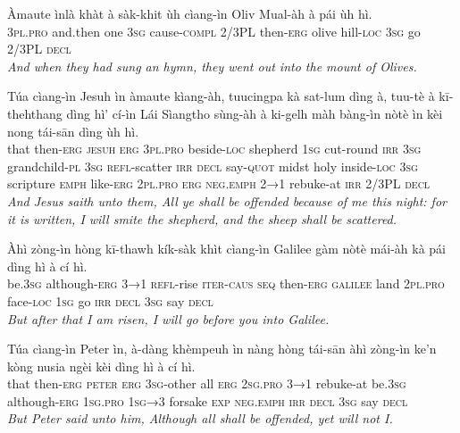 \documentclass[11pt,a4paper]{article}
\begin{document}
\begin{exe}
\gll Àmaute ìnlà khàt à sàk-khit ùh cìang-ìn Oliv Mual-àh à pái ùh hì. \\
     \textsc{3pl}.\textsc{pro} and.then one \textsc{3sg} cause-\textsc{compl} 2/3PL then-\textsc{erg} olive hill-\textsc{loc} \textsc{3sg} go 2/3PL \textsc{decl} \\
\glt \textcolor{kjvcolor}{\textit{And when they had sung an hymn, they went out into the mount of Olives.}}

\gll Túa cìang-ìn Jesuh ìn àmaute kìang-àh, tuucingpa kà sat-lum dìng à, tuu-tè à kī-thehthang dìng hì' cí-ìn Lái Sìangtho sùng-àh à ki-gelh màh bàng-ìn nòtè ìn kèi nong tái-sān dìng ùh hì. \\
     that then-\textsc{erg} \textsc{jesuh} \textsc{erg} \textsc{3pl}.\textsc{pro} beside-\textsc{loc} shepherd \textsc{1sg} cut-round \textsc{irr} \textsc{3sg} grandchild-\textsc{pl} \textsc{3sg} \textsc{refl}-scatter \textsc{irr} \textsc{decl} say-\textsc{quot} midst holy inside-\textsc{loc} \textsc{3sg} scripture \textsc{emph} like-\textsc{erg} \textsc{2pl}.\textsc{pro} \textsc{erg} \textsc{neg}.\textsc{emph} \textsc{2→1} rebuke-at \textsc{irr} 2/3PL \textsc{decl} \\
\glt \textcolor{kjvcolor}{\textit{And Jesus saith unto them, All ye shall be offended because of me this night: for it is written, I will smite the shepherd, and the sheep shall be scattered.}}

\gll Àhì zòng-ìn hòng kī-thawh kík-sàk khìt cìang-ìn Galilee gàm nòtè mái-àh kà pái dìng hì à cí hì. \\
     be.\textsc{3sg} although-\textsc{erg} \textsc{3→1} \textsc{refl}-rise \textsc{iter}-\textsc{caus} \textsc{seq} then-\textsc{erg} \textsc{galilee} land \textsc{2pl}.\textsc{pro} face-\textsc{loc} \textsc{1sg} go \textsc{irr} \textsc{decl} \textsc{3sg} say \textsc{decl} \\
\glt \textcolor{kjvcolor}{\textit{But after that I am risen, I will go before you into Galilee.}}

\gll Túa cìang-ìn Peter ìn, à-dàng khèmpeuh ìn nàng hòng tái-sān àhì zòng-ìn ke'n kòng nusia ngèi kèi dìng hì à cí hì. \\
     that then-\textsc{erg} \textsc{peter} \textsc{erg} \textsc{3sg}-other all \textsc{erg} \textsc{2sg}.\textsc{pro} \textsc{3→1} rebuke-at be.\textsc{3sg} although-\textsc{erg} \textsc{1sg}.\textsc{pro} \textsc{1sg→3} forsake \textsc{exp} \textsc{neg}.\textsc{emph} \textsc{irr} \textsc{decl} \textsc{3sg} say \textsc{decl} \\
\glt \textcolor{kjvcolor}{\textit{But Peter said unto him, Although all shall be offended, yet will not I.}}


\end{exe}
\end{document}

